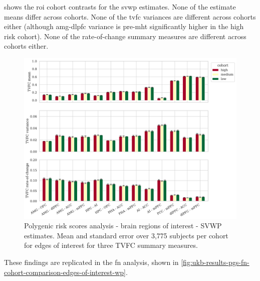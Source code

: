  shows the \gls{roi} cohort contrasts for the \gls{svwp} estimates.
None of the estimate means differ across cohorts.
None of the \gls{tvfc} variances are different across cohorts either (although \gls{amg}-\gls{dlpfc} variance is pre-\gls{mht} significantly higher in the high risk cohort).
None of the rate-of-change summary measures are different across cohorts either.


\begin{figure}[h]
  \centering
  \includegraphics[width=\textwidth]{fig/ukbiobank/TVFC_predictions_summaries/pgs/cohort_comparison/ROI/correlation_all_TVFC_summary_measures_SVWP_joint_edges_of_interest}
  \caption{
    Polygenic risk scores analysis - brain regions of interest - SVWP estimates.
    Mean and standard error over 3,775 subjects per cohort for edges of interest for three TVFC summary measures.
  }
  \label{fig:ukb-results-pgs-roi-cohort-comparison-edges-of-interest-wp}
\end{figure}


These findings are replicated in the \gls{fn} analysis, shown in \cref{fig:ukb-results-pgs-fn-cohort-comparison-edges-of-interest-wp}.


